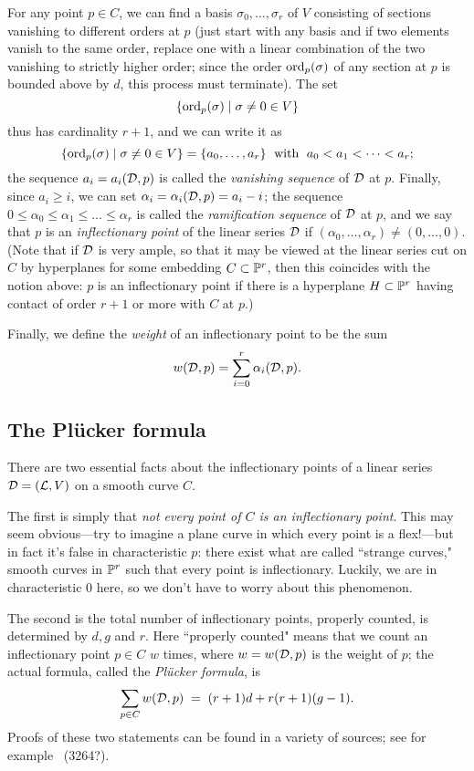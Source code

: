 For any point $p \in C$, we can find a basis $\sigma_0, \dots, \sigma_r$ of $V$ consisting of sections vanishing to different orders at $p$ (just start with any basis and if two elements vanish to the same order, replace one with a linear combination of the two vanishing to strictly higher order; since the order $\ord_p(\sigma)$ of any section at $p$ is bounded above by $d$, this process must terminate). The set
$$
\{ \ord_p(\sigma) \mid \sigma \neq 0 \in V \}
$$
thus has cardinality $r+1$, and we can write it as
$$
\{ \ord_p(\sigma) \mid \sigma \neq 0 \in V \} = \{a_0,\dots,a_r\} \; \text{ with } \; a_0 < a_1 < \dots < a_r;
$$
the sequence $a_i = a_i(\cD,p)$ is called the \emph{vanishing sequence} of $\cD$ at $p$.  Finally, since $a_i \geq i$, we can set $\alpha_i = \alpha_i(\cD,p) = a_i - i$; the sequence $0 \leq \alpha_0 \leq \alpha_1 \leq \dots \leq \alpha_r$ is called the \emph{ramification sequence} of $\cD$ at $p$, and we say that $p$ is an \emph{inflectionary point} of the linear series $\cD$ if $(\alpha_0,\dots,\alpha_r) \neq (0,\dots,0)$. (Note that if $\cD$ is very ample, so that it may be viewed at the linear series cut on $C$ by hyperplanes for some embedding $C \subset \PP^r$, then this coincides with the notion above: $p$ is an inflectionary point if there is a hyperplane $H \subset \PP^r$ having contact of order $r+1$ or more with $C$ at $p$.)

Finally, we define the \emph{weight} of an inflectionary point to be the sum
$$
w(\cD, p) = \sum_{i=0}^r \alpha_i(\cD, p).
$$

\subsection{The Pl\"ucker formula}

There are two essential facts about the inflectionary points of a linear series $\cD = (\cL,V)$ on a smooth curve $C$.

The first is simply that \emph{not every point of $C$ is an inflectionary point}. This may seem obvious---try to imagine a plane curve in which every point is a flex!---but in fact it's false in characteristic $p$: there exist what are called ``strange curves," smooth curves in $\PP^r$ such that every point is inflectionary. Luckily, we are in characteristic 0 here, so we don't have to worry about this phenomenon.

The second is the total number of inflectionary points, properly counted, is determined by $d, g$ and $r$. Here ``properly counted" means that we count an inflectionary point $p \in C$ $w$ times, where $w = w(\cD,p)$ is the weight of $p$; the actual formula, called the \emph{Pl\"ucker formula}, is
$$
\sum_{p \in C} w(\cD, p) \; = \; (r+1)d + r(r+1)(g-1).
$$
Proofs of these two statements can be found in a variety of sources; see for example~\cite{} (3264?). 


